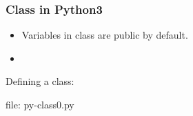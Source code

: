 \begin{frame}[fragile]
\frametitle{Class in Python3}
\begin{itemize}
\item Variables in class are public by default.
\item 
\end{itemize}

Defining a class:


file: py-class0.py
\end{frame}